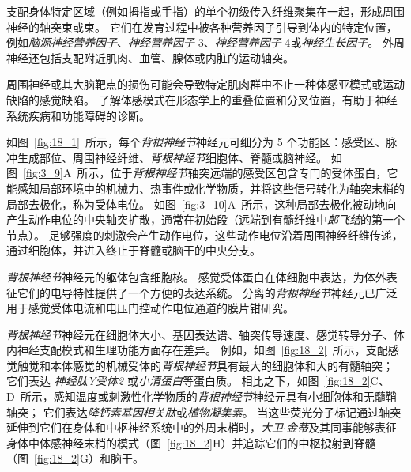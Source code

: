 支配身体特定区域（例如拇指或手指）的单个初级传入纤维聚集在一起，形成周围神经的轴突束或束。
它们在发育过程中被各种营养因子引导到体内的特定位置，例如\textit{脑源神经营养因子}、\textit{神经营养因子} 3、\textit{神经营养因子} 4或\textit{神经生长因子}。
外周神经还包括支配附近肌肉、血管、腺体或内脏的运动轴突。


周围神经或其大脑靶点的损伤可能会导致特定肌肉群中不止一种体感亚模式或运动缺陷的感觉缺陷。
了解体感模式在形态学上的重叠位置和分叉位置，有助于神经系统疾病和功能障碍的诊断。


如图~\ref{fig:18_1}~所示，每个\textit{背根神经节}神经元可细分为 5 个功能区：感受区、脉冲生成部位、周围神经纤维、\textit{背根神经节}细胞体、脊髓或脑神经。
如图~\ref{fig:3_9}A~所示，位于\textit{背根神经节}轴突远端的感受区包含专门的受体蛋白，它能感知局部环境中的机械力、热事件或化学物质，并将这些信号转化为轴突末梢的局部去极化，称为受体电位。
如图~\ref{fig:3_10}A~所示，这种局部去极化被动地向产生动作电位的中央轴突扩散，通常在初始段（远端到有髓纤维中\textit{郎飞结}的第一个节点）。
足够强度的刺激会产生动作电位，这些动作电位沿着周围神经纤维传递，通过细胞体，并进入终止于脊髓或脑干的中央分支。


\textit{背根神经节}神经元的躯体包含细胞核。 
感觉受体蛋白在体细胞中表达，为体外表征它们的电导特性提供了一个方便的表达系统。 
分离的\textit{背根神经节}神经元已广泛用于感觉受体电流和电压门控动作电位通道的膜片钳研究。


\textit{背根神经节}神经元在细胞体大小、基因表达谱、轴突传导速度、感觉转导分子、体内神经支配模式和生理功能方面存在差异。
例如，如图~\ref{fig:18_2}~所示，支配感觉触觉和本体感觉的机械受体的\textit{背根神经节}具有最大的细胞体和大的有髓轴突；
它们表达 \textit{神经肽Y受体2} 或\textit{小清蛋白}等蛋白质。
相比之下，如图~\ref{fig:18_2}C、D~所示，感知温度或刺激性化学物质的\textit{背根神经节}神经元具有小细胞体和无髓鞘轴突；
它们表达\textit{降钙素基因相关肽}或\textit{植物凝集素}。
当这些荧光分子标记通过轴突延伸到它们在身体和中枢神经系统中的外周末梢时，\textit{大卫$\cdot$金蒂}及其同事能够表征身体中体感神经末梢的模式（图~\ref{fig:18_2}H）并追踪它们的中枢投射到脊髓（图~\ref{fig:18_2}G）和脑干。


